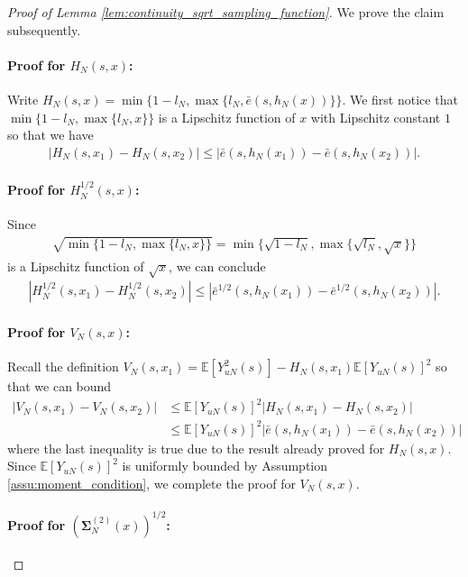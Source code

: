 \documentclass[12pt]{article}
\newcommand{\E}{\mathbb E}								%
\begin{document}
\begin{proof}[Proof of Lemma \ref{lem:continuity_sqrt_sampling_function}]

	We prove the claim subsequently.

	\paragraph{Proof for $H_N(s,x)$:}

	Write $H_N(s,x)=\min\{1-l_N, \max\{l_N,\bar e(s,h_N(x))\}\}$. We first notice that $\min\{1-l_N, \max\{l_N,x\}\}$ is a Lipschitz function of $x$ with Lipschitz constant $1$ so that we have
	\begin{align*}
		|H_N(s,x_1)-H_N(s,x_2)|\leq|\bar e(s,h_N(x_1))-\bar e(s,h_N(x_2))|.
	\end{align*}
	

	\paragraph{Proof for $H_N^{1/2}(s,x)$:}

	Since 
	\begin{align*}
		\sqrt{\min\{1-l_N,\max\{l_N,x\}\}}=\min\{\sqrt{1-l_N},\max\{\sqrt{l_N},\sqrt{x}\}\}
	\end{align*}
	is a Lipschitz function of $\sqrt{x}$, we can conclude 
	\begin{align*}
		|H_N^{1/2}(s,x_1)-H_N^{1/2}(s,x_2)|\leq |\bar e^{1/2}(s,h_N(x_1))-\bar e^{1/2}(s,h_N(x_2))|.
	\end{align*}
	
	\paragraph{Proof for $V_{N}(s, x)$:}

	Recall the definition $V_{N}(s, x_1)=\E[Y_{uN}^2(s)]-H_N(s,x_1)\E[Y_{uN}(s)]^2$ so that we can bound 
	\begin{align*}
		|V_{N}(s, x_1)-V_{N}(s, x_2)|
		&
		\leq \E[Y_{uN}(s)]^2|H_N(s,x_1)-H_N(s,x_2)|\\
		&
		\leq \E[Y_{uN}(s)]^2|\bar e(s,h_N(x_1))-\bar e(s,h_N(x_2))|
	\end{align*}
	where the last inequality is true due to the result already proved for $H_N(s,x)$. Since $\E[Y_{uN}(s)]^2$ is uniformly bounded by Assumption \ref{assu:moment_condition}, we complete the proof for $V_N(s,x)$.

	\paragraph{Proof for $(\bm \Sigma_N^{(2)}(x))^{1/2}$:}


\end{proof}
\end{document}
